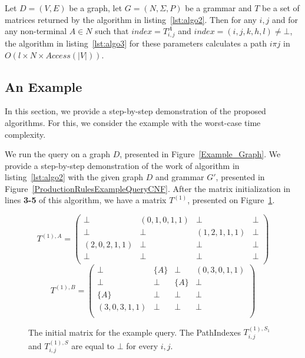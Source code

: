 \begin{myproposition}\label{thm:time_extraction}
	Let $D = (V,E)$ be a graph, let $G =(N,\Sigma,P)$ be a grammar and $T$ be a set of matrices returned by the algorithm in listing~\ref{lst:algo2}. Then for any $i, j$ and for any non-terminal $A \in N$ such that $index = T^A_{i,j}$ and $index = (i,j,k,h,l) \neq \bot$, the algorithm in listing~\ref{lst:algo3} for these parameters calculates a path $i \pi j$ in $O(l \times N \times Access(|V|))$.
\end{myproposition}

\subsection{An Example}
In this section, we provide a step-by-step demonstration of the proposed algorithms. For this, we consider the example with the worst-case time complexity.

We run the query on a graph $D$, presented in Figure~\ref{Example_Graph}. We provide a step-by-step demonstration of the work of algorithm in listing~\ref{lst:algo2} with the given graph $D$ and grammar $G'$, presented in Figure~\ref{ProductionRulesExampleQueryCNF}. After the matrix initialization in lines \textbf{3-5} of this algorithm, we have a matrix $T^{(1)}$, presented on Figure~\ref{ExampleQueryInitMatrix}.

\begin{figure}[h]
	\[
	T^{(1),A} = \begin{pmatrix}
	\bot & (0,1,0,1,1)       & \bot & \bot       \\
	\bot & \bot & (1,2,1,1,1)       & \bot \\
	(2,0,2,1,1)       & \bot & \bot & \bot \\
	\bot       & \bot & \bot & \bot \\
	\end{pmatrix}
	\]
	\[
	T^{(1),B} = \begin{pmatrix}
	\bot & \{A\}       & \bot & (0,3,0,1,1)       \\
	\bot & \bot & \{A\}       & \bot \\
	\{A\}       & \bot & \bot & \bot \\
	(3,0,3,1,1)      & \bot & \bot & \bot \\
	\end{pmatrix}
	\]
	\caption{The initial matrix for the example query. The PathIndexes $T^{(1),S_1}_{i,j}$ and $T^{(1),S}_{i,j}$ are equal to $\bot$ for every $i,j$.}
	\label{ExampleQueryInitMatrix}
\end{figure}

